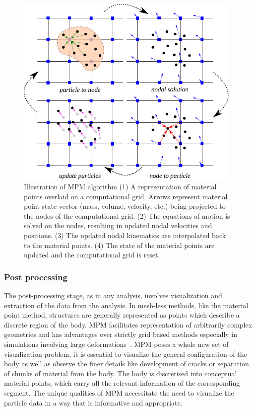 \begin{figure}[htbp]
\centering
\includegraphics[width=0.975\textwidth]{MPMsteps}
\caption[Illustration of MPM algorithm]{Illustration of MPM algorithm (1) A 
representation of material points overlaid on a computational grid. Arrows 
represent material point state vector (mass, volume, velocity, etc.) being 
projected to the nodes of the computational grid. (2) The equations of motion 
is solved on the nodes, resulting in updated nodal velocities and positions. 
(3) The updated nodal kinematics are interpolated back to the material points. 
(4)  The state of the material points are updated and the computational grid is 
reset.} 
\label{fig:MPMsteps}
\end{figure}

\subsubsection{Post processing}

The post-processing stage, as in any analysis, involves visualization 
and extraction of the data from the analysis. In mesh-less methods, like the 
material point method, structures are generally represented as points which 
describe a discrete region of the body. MPM facilitates representation of 
arbitrarily complex geometries and has advantages over strictly grid based 
methods especially in simulations involving large 
deformations~\citep{Bardenhagen2000}. MPM poses a whole new set of 
visualization problem, it is essential to visualize the general configuration 
of the body as well as observe the finer details like development of cracks or 
separation of chunks of material from the body. The body is discretised into 
conceptual material points, which carry all the relevant information of the 
corresponding segment. The unique qualities of MPM necessitate the need to 
visualize the particle data in a way that is informative and appropriate.


